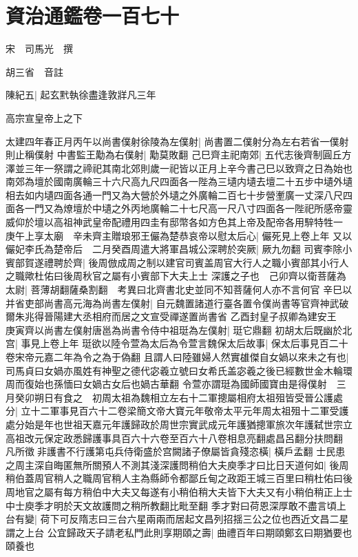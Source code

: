 \chapter{資治通鑑卷一百七十}
宋　司馬光　撰

胡三省　音註

陳紀五|{
	起玄黓執徐盡逢敦牂凡三年}


高宗宣皇帝上之下

太建四年春正月丙午以尚書僕射徐陵為左僕射|{
	尚書置二僕射分為左右若省一僕射則止稱僕射}
中書監王勱為右僕射|{
	勱莫敗翻}
己巳齊主祀南郊|{
	五代志後齊制圓丘方澤並三年一祭謂之禘祀其南北郊則歲一祀皆以正月上辛今書己巳以致齊之日為始也南郊為壇於國南廣輪三十六尺高九尺四面各一陛為三壝内壝去壇二十五步中壝外壝相去如内壝四面各通一門又為大營於外壝之外廣輪二百七十步營壍廣一丈深八尺四面各一門又為燎壇於中壝之外丙地廣輪二十七尺高一尺八寸四面各一陛祀所感帝靈威仰於壇以高祖神武皇帝配禮用四圭有邸幣各如方色其上帝及配帝各用騂特牲一}
庚午上享太廟　辛未齊主贈琅邪王儼為楚恭哀帝以慰太后心|{
	儼死見上卷上年}
又以儼妃李氏為楚帝后　二月癸酉周遣大將軍昌城公深聘於突厥|{
	厥九勿翻}
司賓李除小賓部賀遂禮聘於齊|{
	後周倣成周之制以建官司賓盖周官大行人之職小賓部其小行人之職歟杜佑曰後周秋官之屬有小賓部下大夫上士}
深護之子也　己卯齊以衛菩薩為太尉|{
	菩薄胡翻薩桑割翻　考異曰北齊書北史並同不知菩薩何人亦不言何官}
辛巳以并省吏部尚書高元海為尚書左僕射|{
	自元魏置諸道行臺各置令僕尚書等官齊神武破爾朱兆得晉陽建大丞相府而居之文宣受禪遂置尚書省}
乙酉封皇子叔卿為建安王　庚寅齊以尚書左僕射唐邕為尚書令侍中祖珽為左僕射|{
	珽它鼎翻}
初胡太后既幽於北宫|{
	事見上卷上年}
珽欲以陸令萱為太后為令萱言魏保太后故事|{
	保太后事見百二十卷宋帝元嘉二年為令之為于偽翻}
且謂人曰陸雖婦人然實䧺傑自女媧以來未之有也|{
	司馬貞曰女媧亦風姓有神聖之德代宓羲立號曰女希氏盖宓羲之後已經數世金木輪環周而復始也孫愐曰女媧古女后也媧古華翻}
令萱亦謂珽為國師國寶由是得僕射　三月癸卯朔日有食之　初周太祖為魏相立左右十二軍摠屬相府太祖殂皆受晉公護處分|{
	立十二軍事見百六十二卷梁簡文帝大寶元年敬帝太平元年周太祖殂十二軍受護處分始是年也世祖天嘉元年護歸政於周世宗實武成元年護猶摠軍旅次年護弑世宗立高祖改元保定政悉歸護事具百六十六卷至百六十八卷相息亮翻處昌呂翻分扶問翻}
凡所徵非護書不行護第屯兵侍衛盛於宫闕諸子僚屬皆貪殘恣橫|{
	橫戶孟翻}
士民患之周主深自晦匿無所關預人不測其淺深護問稍伯大夫庾季才曰比日天道何如|{
	後周稍伯蓋周官稍人之職周官稍人主為縣師令都鄙丘甸之政距王城三百里曰稍杜佑曰後周地官之屬有每方稍伯中大夫又每遂有小稍伯稍大夫皆下大夫又有小稍伯稍正上士中士庾季才明於天文故護問之稍所教翻比毗至翻}
季才對曰荷恩深厚敢不盡言頃上台有變|{
	荷下可反隋志曰三台六星兩兩而居起文昌列招揺三公之位也西近文昌二星謂之上台}
公宜歸政天子請老私門此則享期頤之壽|{
	曲禮百年曰期頤鄭玄曰期猶要也頤養也}
